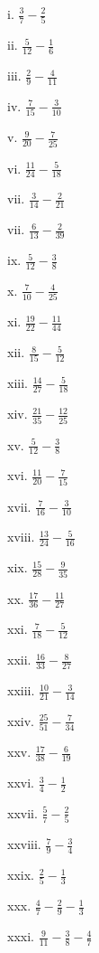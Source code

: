 \documentclass[]{book}
\begin{document}
\begin{multicols}{2}
 
    i. $\frac{3}{7} - \frac{2}{5}$
 
    ii. $\frac{5}{12} - \frac{1}{6}$
 
    iii. $\frac{2}{9} - \frac{4}{11}$
 
    iv. $\frac{7}{15} - \frac{3}{10}$
 
    v. $\frac{9}{20} - \frac{7}{25}$
 
    vi. $\frac{11}{24} - \frac{5}{18}$
 
    vii. $\frac{3}{14} - \frac{2}{21}$
 
    vii. $\frac{6}{13} - \frac{2}{39}$
 
    ix. $\frac{5}{12} - \frac{3}{8}$
 
    x. $\frac{7}{10} - \frac{4}{25}$
 
    xi. $\frac{19}{22} - \frac{11}{44}$
 
    xii. $\frac{8}{15} - \frac{5}{12}$
 
    xiii. $\frac{14}{27} - \frac{5}{18}$    
 
    xiv. $\frac{21}{35} - \frac{12}{25}$
 
    xv. $\frac{5}{12} - \frac{3}{8}$
 
    xvi. $\frac{11}{20} - \frac{7}{15}$
 
    xvii. $\frac{7}{16} - \frac{3}{10}$
 
    xviii. $\frac{13}{24} - \frac{5}{16}$
 
    xix. $\frac{15}{28} - \frac{9}{35}$
 
    xx. $\frac{17}{36} - \frac{11}{27}$
 
    xxi. $\frac{7}{18} - \frac{5}{12}$
 
    xxii. $\frac{16}{33} - \frac{8}{27}$
 
    xxiii. $\frac{10}{21} - \frac{3}{14}$
 
    xxiv. $\frac{25}{51} - \frac{7}{34}$
 
    xxv. $\frac{17}{38} - \frac{6}{19}$
 
    xxvi. $\frac{3}{4} - \frac{1}{2}$
 
    xxvii. $\frac{5}{7} - \frac{2}{5}$
 
    xxviii. $\frac{7}{9} - \frac{3}{4}$
 
    xxix. $\frac{2}{5} - \frac{1}{3}$
 
    xxx. $\frac{4}{7} - \frac{2}{9} - \frac{1}{3}$
 
    xxxi. $\frac{9}{11} - \frac{3}{8} - \frac{4}{7}$
 

\end{multicols}
\end{document}
